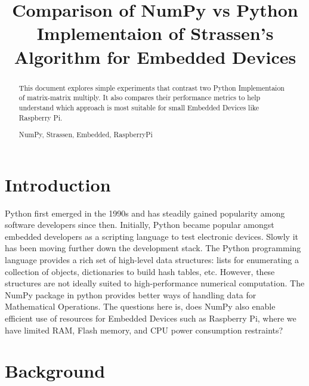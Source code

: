 \documentclass[conference]{IEEEtran}
\begin{document}
\title{Comparison of NumPy vs Python Implementaion of Strassen's Algorithm for Embedded Devices 
}

\author{
}

\maketitle

\begin{abstract}
    This document explores simple experiments that contrast two Python Implementaion of matrix-matrix multiply. It also compares 
    their performance metrics to help understand which approach is most suitable for small Embedded Devices like Raspberry Pi.

\begin{IEEEkeywords}
    NumPy, Strassen, Embedded, RaspberryPi
\end{IEEEkeywords}
\end{abstract}

\section{Introduction}
    Python first emerged in the 1990s and has steadily gained popularity among software developers since then. Initially, 
    Python became popular amongst embedded developers as a scripting language to test electronic devices. Slowly it has been 
    moving further down the development stack. The Python programming language provides a rich set of high-level data structures: 
    lists for enumerating a collection of objects, dictionaries to build hash tables, etc. However, these structures are not ideally 
    suited to high-performance numerical computation. The NumPy package in python provides better ways of handling data for Mathematical 
    Operations. The questions here is, does NumPy also enable efficient use of resources for Embedded Devices such as Raspberry Pi, 
    where we have limited RAM, Flash memory, and CPU power consumption restraints? 

\section{Background}
\end{document}
